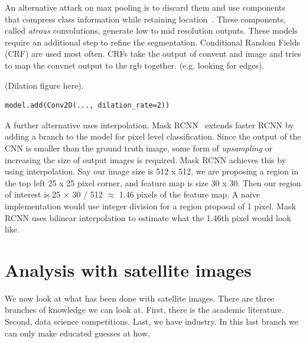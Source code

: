\documentclass[12pt, a4paper, oneside, headinclude, footinclude]{article}
\begin{document}
An alternative attack on max pooling is to discard them and use components
that compress class information while retaining
location~\cite{chen2018,dilated2017}.  These components, called
\textit{atrous} convolutions, generate low to mid resolution outputs. These
models require an additional step to refine the segmentation. Conditional
Random Fields (CRF) are used most often.  CRFs take the output of convent and
image and tries to map the convnet output to the rgb together. (e.g. looking
for edges).

(Dilation figure here).

\begin{verbatim}
model.add(Conv2D(..., dilation_rate=2)) 
\end{verbatim}

A further alternative uses interpolation. Mask RCNN~\cite{he2017} extends
faster RCNN by adding a branch to the model for pixel level classification.
Since the output of the CNN is smaller than the ground truth image, some form
of \textit{upsampling} or increasing the size of output images is required.
Mask RCNN achieves this by using interpolation. Say our image size is 512 x
512, we are proposing a region in the top left 25 x 25 pixel corner, and
feature map is size 30 x 30. Then our region of interest is 25 $\times$ 30 /
512 $\approx$ 1.46 pixels of the feature map. A naive implementation would use
integer division for a region proposal of 1 pixel. Mask RCNN uses bilinear
interpolation to estimate what the 1.46th pixel would look like.





\section{Analysis with satellite images}

We now look at what has been done with satellite images. There are three
branches of knowledge we can look at. First, there is the academic literature.
Second, data science competitions. Last, we have industry. In this last branch
we can only make educated guesses at how.
\end{document}
